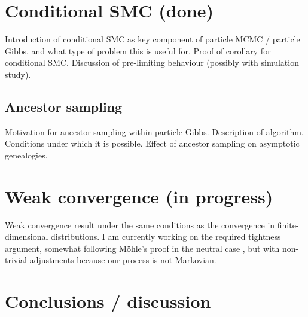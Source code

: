 \documentclass{article}
\begin{document}
\section{Conditional SMC (done)}
Introduction of conditional SMC as key component of particle MCMC / particle Gibbs, and what type of problem this is useful for. Proof of corollary for conditional SMC. Discussion of pre-limiting behaviour (possibly with simulation study).
\subsection{Ancestor sampling}
Motivation for ancestor sampling within particle Gibbs. Description of algorithm. Conditions under which it is possible. Effect of ancestor sampling on asymptotic genealogies.

\section{Weak convergence (in progress)}
Weak convergence result under the same conditions as the convergence in finite-dimensional distributions. I am currently working on the required tightness argument, somewhat following M\"ohle's proof in the neutral case \citep{mohle1999}, but with non-trivial adjustments because our process is not Markovian.


\section{Conclusions / discussion}


\end{document}
